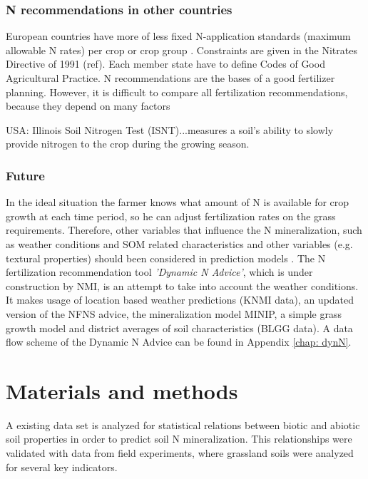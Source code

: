\documentclass[10pt,twoside,dutch,english]{report}
\begin{document}
\subsection{N recommendations in other countries}
European countries have more of less fixed N-application standards (maximum allowable N rates) per crop or crop group \citep{VanDijk2009}. Constraints are given in the Nitrates Directive of 1991 (ref). Each member state have to define Codes of Good Agricultural Practice. N recommendations are the bases of a good fertilizer planning. However, it is difficult to compare all fertilization recommendations, because they depend on many factors


USA: Illinois Soil Nitrogen Test (ISNT)...measures a soil's ability to slowly provide nitrogen to the crop during the growing season.

\subsection{Future}
 In the ideal situation the farmer knows what amount of N is available for crop growth at each time period, so he can adjust fertilization rates on the grass requirements. Therefore, other variables that influence the N mineralization, such as weather conditions and SOM related characteristics and other variables (e.g. textural properties) should been considered in prediction models \citep{Ros2015}. The N fertilization recommendation tool \textit{'Dynamic N Advice'}, which is under construction by NMI, is an attempt to take into account the weather conditions.  It makes usage of location based weather predictions (KNMI data), an updated version of the NFNS advice, the mineralization model MINIP, a simple grass growth model and district averages of soil characteristics (BLGG data). A data flow scheme of the Dynamic N Advice can be found in Appendix \ref{chap: dynN}.



	
	
	
	

\chapter{Materials and methods}

A existing data set is analyzed for statistical relations between biotic and abiotic soil properties in order to predict soil N mineralization. This relationships were validated with data from field experiments, where grassland soils were analyzed for several key indicators. 
\end{document}
